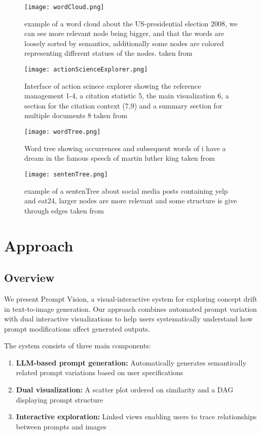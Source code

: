 \documentclass[
  a4paper,  %
  twoside,  %
  bibliography=totoc,
  headsepline,
  cleardoublepage=empty,
  parskip=half,
  draft=false
]{scrbook}
\begin{document}
  \begin{figure}[H]
	\centering
	\texttt{[image: wordCloud.png]}
	\caption{example of a word cloud about the US-presidential election 2008, we can see more relevant node being bigger, and that the words are loosely sorted by semantics, additionally some nodes are colored representing different statues of the nodes.   taken from \cite{wordclouds}}
	\label{fig:wordClouds}
\end{figure}
\begin{figure}[H]
	\centering
	\texttt{[image: actionScienceExplorer.png]}
	\caption{Interface of action scinece explorer showing the reference management 1-4, a citation statistic 5, the main visualization 6, a section for the citation context (7,9) and a summary section for multiple documents 8   taken from   \cite{visualizingPaperCollections}}
	\label{fig:scientificPaperVisualization}
\end{figure}
\begin{figure}[H]
	\centering
	\texttt{[image: wordTree.png]}
	\caption{Word tree showing occurrences and subsequent words of i have a dream in the famous speech of martin luther king taken from   \cite{wordTree}}
	\label{fig:wordTree}
	
\end{figure}
\begin{figure}[H]
	\centering
	\texttt{[image: sentenTree.png]}
	\caption{example of a sentenTree about social media posts containing yelp and eat24, larger nodes are more relevant and some structure is give through edges taken from   \cite{sentenTree}}
	\label{fig:sentenTree}
\end{figure}

\chapter{Approach}

\section{Overview}

We present Prompt Vision, a visual-interactive system for exploring concept drift in text-to-image generation. Our approach combines automated prompt variation with dual interactive visualizations to help users systematically understand how prompt modifications affect generated outputs.

The system consists of three main components:
\begin{enumerate}
	\item \textbf{LLM-based prompt generation:} Automatically generates semantically related prompt variations based on user specifications
	\item \textbf{Dual visualization:} A scatter plot ordered on similarity and a DAG displaying prompt structure
	\item \textbf{Interactive exploration:} Linked views enabling users to trace relationships between prompts and images
\end{enumerate}
\end{document}
